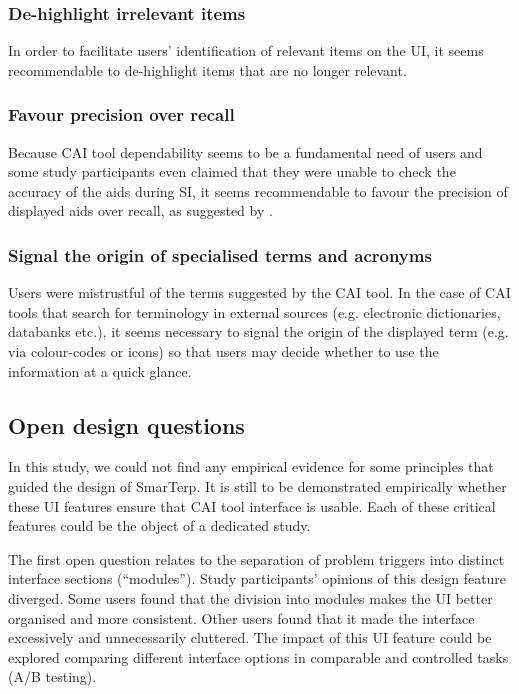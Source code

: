 \subsubsection{De-highlight irrelevant items}

In order to facilitate users’ identification of relevant items on the UI, it seems recommendable to de-highlight items that are no longer relevant.

\subsubsection{Favour precision over recall}

Because CAI tool dependability seems to be a fundamental need of users and some study participants even claimed that they were unable to check the accuracy of the aids during SI, it seems recommendable to favour the precision of displayed aids over recall, as suggested by \citet{fantinuoli2017speech}.



\subsubsection{Signal the origin of specialised terms and acronyms}

Users were mistrustful of the terms suggested by the CAI tool. In the case of CAI tools that search for terminology in external sources (e.g. electronic dictionaries, databanks etc.), it seems necessary to signal the origin of the displayed term (e.g. via colour-codes or icons) so that users may decide whether to use the information at a quick glance.


\subsection{Open design questions}


In this study, we could not find any empirical evidence for some principles that guided the design of SmarTerp. It is still to be demonstrated empirically whether these UI features ensure that CAI tool interface is usable. Each of these critical features could be the object of a dedicated study.

The first open question relates to the separation of problem triggers into distinct interface sections (``modules''). Study participants’ opinions of this design feature diverged. Some users found that the division into modules makes the UI better organised and more consistent. Other users found that it made the interface excessively and unnecessarily cluttered. The impact of this UI feature could be explored comparing different interface options in comparable and controlled tasks (A/B testing).

